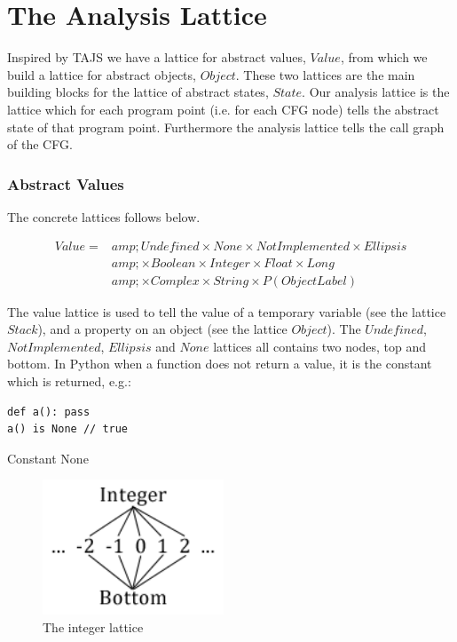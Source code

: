 \chapter{The Analysis Lattice}
Inspired by TAJS we have a lattice for abstract values, $Value$, from which we build a lattice for abstract objects, $Object$. These two lattices are the main building blocks for the lattice of abstract states, $State$. Our analysis lattice is the lattice which for each program point (i.e. for each CFG node) tells the abstract state of that program point. Furthermore the analysis lattice tells the call graph of the CFG.

\subsection{Abstract Values}
The concrete lattices follows below.

\begin{eqnarray*}
Value =&amp; Undefined \times None \times NotImplemented \times Ellipsis \\
	   &amp; \times Boolean \times Integer \times Float \times Long \\
       &amp; \times Complex \times String \times P(ObjectLabel)
\end{eqnarray*}

The value lattice is used to tell the value of a temporary variable (see the lattice $Stack$), and a property on an object (see the lattice $Object$). The $Undefined$, $NotImplemented$, $Ellipsis$ and $None$ lattices all contains two nodes, top and bottom. In Python when a function does not return a value, it is the constant \cite{pyref.constants} which is returned, e.g.:

\begin{listing}[H]
	\begin{verbatim}
def a(): pass
a() is None // true
	\end{verbatim}
	\caption{Constant None}\label{code:NoneExample}
\end{listing}

\begin{figure}
	\vspace{-20pt}
	\begin{center}
		\includegraphics[width=0.48\textwidth]{images/integer-lattice.png}
	\end{center}
	\vspace{-10pt}
	\caption{The integer lattice}
	\label{fig:latticeInteger}
	\vspace{-10pt}
\end{figure}

